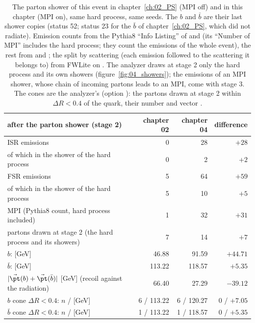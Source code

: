 \begin{table}[htb]
\centering\small
\caption{The parton shower of this event in chapter~\ref{ch:02_PS} (MPI off) and in this chapter (MPI on), same
hard process, same seeds. The $b$ and $\bar b$ are their last shower copies (status 52; status 23 for the
$\bar b$ of chapter~\ref{ch:02_PS}, which did not radiate). Emission counts from the Pythia8 ``Info Listing''
of  and  (its ``Number of MPI'' includes the hard
process; they count the emissions of the whole event), the rest from  and
; the split by scattering (each emission followed to the scattering it belongs
to) from FWLite on . The analyzer draws at stage 2 only the hard process and its
own showers (figure~\ref{fig:04_showers}); the emissions of an MPI shower, whose chain of incoming partons leads to
an MPI, come with stage 3. The cones are the analyzer's (option ): the partons drawn at stage 2
within $\Delta R<0.4$ of the quark, their number and vector \pt.}
\label{tab:04_shower}
\begin{tabular}{lrrr}
\toprule
after the parton shower (stage 2) & chapter 02 & chapter 04 & difference \\
\midrule
ISR emissions & 0 & 28 & $+28$ \\
\quad of which in the shower of the hard process & 0 & 2 & $+2$ \\
FSR emissions & 5 & 64 & $+59$ \\
\quad of which in the shower of the hard process & 5 & 10 & $+5$ \\
MPI (Pythia8 count, hard process included) & 1 & 32 & $+31$ \\
partons drawn at stage 2 (the hard process and its showers) & 7 & 14 & $+7$ \\
$b$: \pt{} [GeV] & 46.88 & 91.59 & $+44.71$ \\
$\bar b$: \pt{} [GeV] & 113.22 & 118.57 & $+5.35$ \\
$|\vec\pt(b)+\vec\pt(\bar b)|$ [GeV] (recoil against the radiation) & 66.40 & 27.29 & $-39.12$ \\
$b$ cone $\Delta R<0.4$: $n$ / \pt{} [GeV] & 6 / 113.22 & 6 / 120.27 & 0 / $+7.05$ \\
$\bar b$ cone $\Delta R<0.4$: $n$ / \pt{} [GeV] & 1 / 113.22 & 1 / 118.57 & 0 / $+5.35$ \\
\bottomrule
\end{tabular}
\end{table}

